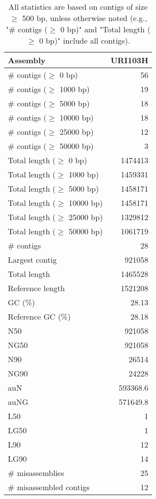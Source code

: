 \documentclass[12pt,a4paper]{article}
\begin{document}
\begin{table}[ht]
\begin{center}
\caption{All statistics are based on contigs of size $\geq$ 500 bp, unless otherwise noted (e.g., "\# contigs ($\geq$ 0 bp)" and "Total length ($\geq$ 0 bp)" include all contigs).}
\begin{tabular}{|l*{1}{|r}|}
\hline
Assembly & URI103H \\ \hline
\# contigs ($\geq$ 0 bp) & 56 \\ \hline
\# contigs ($\geq$ 1000 bp) & 19 \\ \hline
\# contigs ($\geq$ 5000 bp) & 18 \\ \hline
\# contigs ($\geq$ 10000 bp) & 18 \\ \hline
\# contigs ($\geq$ 25000 bp) & 12 \\ \hline
\# contigs ($\geq$ 50000 bp) & 3 \\ \hline
Total length ($\geq$ 0 bp) & 1474413 \\ \hline
Total length ($\geq$ 1000 bp) & 1459331 \\ \hline
Total length ($\geq$ 5000 bp) & 1458171 \\ \hline
Total length ($\geq$ 10000 bp) & 1458171 \\ \hline
Total length ($\geq$ 25000 bp) & 1329812 \\ \hline
Total length ($\geq$ 50000 bp) & 1061719 \\ \hline
\# contigs & 28 \\ \hline
Largest contig & 921058 \\ \hline
Total length & 1465528 \\ \hline
Reference length & 1521208 \\ \hline
GC (\%) & 28.13 \\ \hline
Reference GC (\%) & 28.18 \\ \hline
N50 & 921058 \\ \hline
NG50 & 921058 \\ \hline
N90 & 26514 \\ \hline
NG90 & 24228 \\ \hline
auN & 593368.6 \\ \hline
auNG & 571649.8 \\ \hline
L50 & 1 \\ \hline
LG50 & 1 \\ \hline
L90 & 12 \\ \hline
LG90 & 14 \\ \hline
\# misassemblies & 25 \\ \hline
\# misassembled contigs & 12 \\ \hline

\end{tabular}
\end{center}
\end{table}
\end{document}
